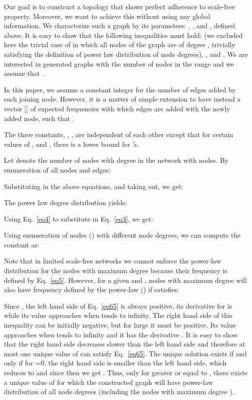 \documentclass[10pt,journal,cspaper,compsoc]{IEEEtran}
\begin{document}
Our goal is to construct a topology that shows perfect adherence to scale-free property. Moreover, we want to achieve this without using any global information. We characterize such a graph by its parameters: , ,  and , defined above. It is easy to show that the following inequalities must hold:  (we excluded here the trivial case of  in which all nodes of the graph are of degree , trivially satisfying the definition of power law distribution of node degrees), , and . We are interested in generated graphs with the number of nodes in the range  and we assume that .

In this paper, we assume a constant integer  for the number of edges added by each joining node. However, it is a matter of simple extension to have instead a vector [] of expected frequencies with which  edges are added with the newly added node, such that  .

The three constants, , ,  are independent of each other except that for certain values of , and , there is a lower bound for 's.

Let  denote the number of nodes with degree  in the network with  nodes.
By enumeration of all nodes and edges:
	

Substituting  in the above equations, and taking  out, we get:


The power law degree distribution yields:


Using Eq.~\ref{eq4} to substitute  in Eq.~\ref{eq3}, we get:


Using enumeration of nodes () with different node degrees, we can compute the constant  as:


Note that in limited scale-free networks we cannot enforce the power-law distribution for the nodes with maximum degree  because their frequency is defined by Eq.~\ref{eq5}. However, for a given  and , nodes with maximum degree will also have frequency defined by the power-law () if  satisfies:



Since , the left hand side of Eq.~\ref{eq65} is always positive, its derivative for  is  while its value approaches  when  tends to infinity. The right hand side of this inequality can be initially negative, but for large  it must be positive. Its value approaches  when  tends to infinity and it has the derivative .
It is easy to show that the right hand side decreases slower than the left hand side and therefore at most one unique value of  can satisfy Eq.~\ref{eq65}. The unique solution exists if and only if for =0, the right hand side is smaller than the left hand side, 
which reduces to  and since  then we get . Thus, only for  greater or equal to , there exists a unique value of  for which the constructed graph will have power-law distribution of all node degrees (including the nodes with maximum degree ).
\end{document}
